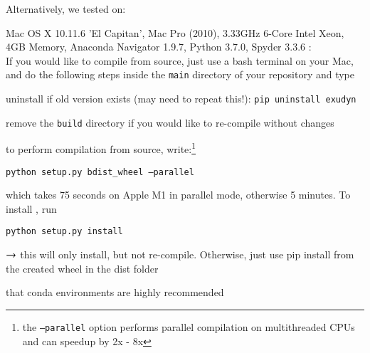 Alternatively, we tested on:
\bi
  \item Mac OS X 10.11.6 'El Capitan', Mac Pro (2010), 3.33GHz 6-Core Intel Xeon, 4GB Memory, Anaconda Navigator 1.9.7, Python 3.7.0, Spyder 3.3.6
\ei
%
%
\vspace{9pt}
:\vspace{3pt}\\
If you would like to compile from source, just use a bash terminal on your Mac, and do the following steps inside the \texttt{main} directory of your repository and type
\bi
  \item uninstall if old version exists (may need to repeat this!): \texttt{pip uninstall exudyn}
  \item remove the \texttt{build} directory if you would like to re-compile without changes
  \item to perform compilation from source, write:\footnote{the \texttt{--parallel} option performs parallel compilation on multithreaded CPUs and can speedup by 2x - 8x}
  \item \texttt{python setup.py bdist\_wheel --parallel}
  \item which takes 75 seconds on Apple M1 in parallel mode, otherwise 5 minutes. To install \codeName, run
  \item[] \texttt{python setup.py install}
  \item[] $\rightarrow$ this will only install, but not re-compile. Otherwise, just use pip install from the created wheel in the dist folder
  \item[]  that conda environments are highly recommended
